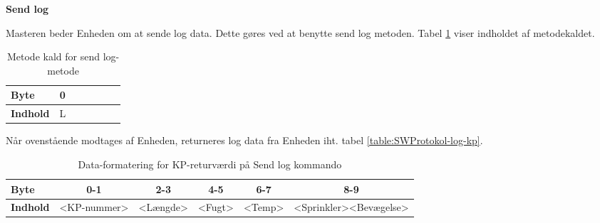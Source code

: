 \textbf{Send log}

Masteren beder Enheden om at sende log data. Dette gøres ved at benytte send log metoden. Tabel \ref{table:SWProtokol-log} viser indholdet af metodekaldet. 

\begin{table}[H]
	\caption{Metode kald for send log-metode}
	\centering
	\begin{tabular}{|l|c|c|c|c|c|c|}
		\hline 
		\textbf{Byte} & 0 \\ 
		\hline 
		\textbf{Indhold} & L \\ 
		\hline 
	\end{tabular} 
	\label{table:SWProtokol-log}
\end{table}

Når ovenstående modtages af Enheden, returneres log data fra Enheden iht. tabel \ref{table:SWProtokol-log-kp}. 

\begin{table}[H]
	\caption{Data-formatering for KP-returværdi på Send log kommando}
	\centering
	\begin{tabular}{|l|c|c|c|c|c|}
		\hline 
		\textbf{Byte} & 0-1 & 2-3 & 4-5 & 6-7 & 8-9\\ 
		\hline 
		\textbf{Indhold} & <KP-nummer> & <Længde> & <Fugt> & <Temp> & <Sprinkler><Bevægelse> \\ 
		\hline 
	\end{tabular} 
	\label{table:SWProtokol-log-retur}
\end{table}
